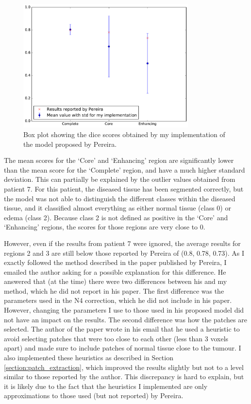 \documentclass[12pt,a4paper,twoside,openright]{report}
\newlength\figureheight
\newlength\figurewidth
\begin{document}
\begin{figure}
	\centering
%	
	\includegraphics[width=0.8\textwidth]{plots/pereira_box_plot2}
	\caption{Box plot showing the dice scores obtained by my implementation of the model proposed by Pereira.}
	\label{pereira_box_plot}
\end{figure}

The mean scores for the `Core' and `Enhancing' region are significantly lower than the mean score for the `Complete' region, and have a much higher standard deviation. This can partially be explained by the outlier values obtained from patient 7. For this patient, the diseased tissue has been segmented correctly, but the model was not able to distinguish the different classes within the diseased tissue, and it classified almost everything as either normal tissue (class 0) or edema (class 2). Because class 2 is not defined as positive in the `Core' and `Enhancing' regions, the scores for those regions are very close to 0.  

However, even if the results from patient 7 were ignored, the average results for regions 2 and 3 are still below those reported by Pereira \cite{pereira} of (0.8, 0.78, 0.73). As I exactly followed the method described in the paper published by Pereira, I emailed the author asking for a possible explanation for this difference. He answered that (at the time) there were two differences between his and my method, which he did not report in his paper. The first difference was the parameters used in the N4 correction, which he did not include in his paper. However, changing the parameters I use to those used in his proposed model did not have an impact on the results. The second difference was how the patches are selected. The author of the paper wrote in his email that he used a heuristic to avoid selecting patches that were too close to each other (less than 3 voxels apart) and made sure to include patches of normal tissue close to the tumour. I also implemented these heuristics as described in Section \ref{section:patch_extraction}, which improved the results slightly but not to a level similar to those reported by the author. This discrepancy is hard to explain, but it is likely due to the fact that the heuristics I implemented are only approximations to those used (but not reported) by Pereira.
\end{document}

